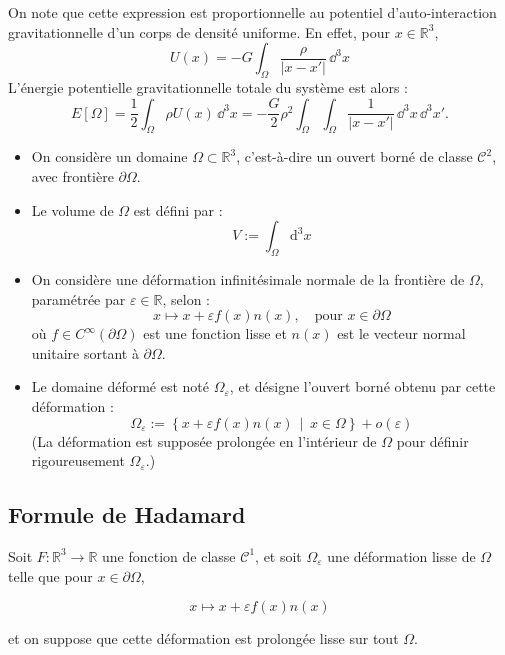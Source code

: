 \documentclass[a4paper,10pt]{report}
\newcommand{\RR}{\mathbb{R}}
\begin{document}
On note que cette expression est proportionnelle au potentiel d'auto-interaction gravitationnelle d'un corps de densité uniforme.
En effet, pour $x \in \RR^3$,
$$ U(x) = -G \int_{\Omega} \frac{\rho}{|x - x'|} \,  \dd^3x$$
L’énergie potentielle gravitationnelle totale du système est alors :
\[
E[\Omega] = \frac{1}{2} \int_{\Omega} \rho U( {x}) \,  \dd^3x = -\frac{G}{2} \rho^2 \int_{\Omega} \int_{\Omega} \frac{1}{| {x} -  {x}'|} \,  \dd^3x \,  \dd^3x'.
\]
	\begin{itemize}
	\item On considère un domaine \(\Omega \subset \mathbb{R}^3\), c’est-à-dire un ouvert borné de classe \( \mathcal{C}^2\), avec frontière \(\partial \Omega\).
	
	\item Le volume de \(\Omega\) est défini par :
	\[
	V := \int_{\Omega} \text{d}^3 x
	\]
	
	\item On considère une déformation infinitésimale normale de la frontière de \(\Omega\), paramétrée par \(\varepsilon \in \mathbb{R}\), selon :
	\[
x \mapsto x + \varepsilon f(x) n(x), \quad \text{pour } x \in \partial \Omega
	\]
	où \(f \in C^\infty(\partial \Omega)\) est une fonction lisse et \(n(x)\) est le vecteur normal unitaire sortant à \(\partial \Omega\).
	
	\item Le domaine déformé est noté \(\Omega_\varepsilon\), et désigne l’ouvert borné obtenu par cette déformation :
	\[
	\Omega_\varepsilon := \left\{ x + \varepsilon f(x) n(x) \,\middle|\, x \in \Omega \right\} + o(\varepsilon)
	\]
	(La déformation est supposée prolongée en l'intérieur de \(\Omega\) pour définir rigoureusement \(\Omega_\varepsilon\).)
\end{itemize}
\subsection{Formule de Hadamard}
	Soit $F : \RR^3 \to \RR$ une fonction de classe $\mathcal{C}^1$, et soit $\Omega_\varepsilon$ une déformation lisse de $\Omega$ telle que pour $x \in \partial \Omega$,

$$
x \mapsto x + \varepsilon f(x) n(x)
$$

et on suppose que cette déformation est prolongée lisse sur tout $\Omega$.
\end{document}
